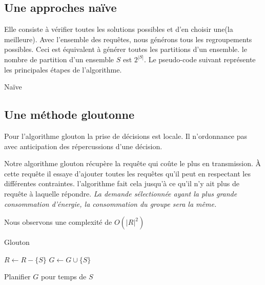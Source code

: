\documentclass[runningheads]{llncs}
\begin{document}
\subsection{Une approches na\"ive }
Elle consiste à vérifier toutes les solutions possibles et d'en choisir une(la meilleure).
Avec l'ensemble des requêtes, nous générons tous les regroupements possibles.
Ceci est équivalent à générer toutes les partitions d'un ensemble.
le nombre de partition d'un ensemble $S$ est $2^{|S|}$.
Le pseudo-code suivant représente les principales étapes de l'algorithme.
\begin{algorithm}[H]
    \caption{Na\"ive}%
    \label{alg:naive}
    \begin{algorithmic}[1]
        \EndFor{}
        
    
    \end{algorithmic}
\end{algorithm}


  
\subsection{Une m\'ethode gloutonne}
Pour l'algorithme glouton la prise de décisions  est locale. 
Il n'ordonnance pas avec anticipation des répercussions d'une décision.

Notre algorithme glouton récupère la requête qui coûte le plus en transmission.
À cette requête il essaye d'ajouter toutes les requêtes qu'il peut en respectant 
les différentes contraintes. 
l'algorithme fait cela jusqu'à ce qu'il n'y ait plus de requête à laquelle répondre.
\emph{La demande sélectionnée ayant la plus grande consommation d'énergie, 
la consommation du groupe sera la même.}

Nous observons une complexité  de $O(|R|^2)$
\begin{algorithm}[H]
    \caption{Glouton}%
    \label{alg:greedy}
    \begin{algorithmic}[1]
        \State $ R \gets R - \{S\}$
        \State $ G \gets G \cup \{S\}$
      
          \EndIf{}
       \EndFor{}
       Planifier $G$ pour temps de $S$
      \EndWhile{}
    \end{algorithmic}
  \end{algorithm}
\end{document}
